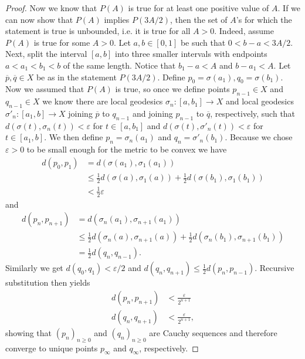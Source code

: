 \documentclass[10pt,a4paper]{amsart}
\begin{document}
\begin{proof}
\medskip
Now we know that $P(A)$ is true for at least one positive value of \(A\). If we can now show that \(P(A)\) implies \(P(3A/2)\), then the set of \(A\)'s for which the statement is true is unbounded, i.e. it is true for all \(A>0\). Indeed, assume $P(A)$ is true for some \(A>0\).
Let \(a,b\in [0,1]\) be such that \(0<b-a<3A/2\).
Next, split the interval \([a,b]\) into three smaller intervals with endpoints \(a<a_1<b_1<b\) of the same length.
Notice that \(b_1-a<A\) and \(b-a_1<A\).
Let \(\overline{p},\overline{q}\in X\) be as in the statement \(P(3A/2)\).
Define \(p_0=\sigma(a_1),q_0=\sigma(b_1)\).
Now we assumed that \(P(A)\) is true, so once we define points \(p_{n-1}\in X\) and \(q_{n-1}\in X\) we know there are local geodesics \(\sigma_n:[a,b_1]\to X\) and local geodesics \(\sigma'_n:[a_1,b]\to X\) joining \(\overline{p}\) to \(q_{n-1}\) and joining \(p_{n-1}\) to \(\overline{q}\), respectively, such that \(d(\sigma(t),\sigma_n(t))<\varepsilon\) for \(t\in [a,b_1]\) and \(d(\sigma(t),\sigma'_n(t))<\varepsilon\) for \(t\in [a_1,b]\).
We then define \(p_n=\sigma_n(a_1)\) and \(q_n=\sigma'_n(b_1)\).
Because we chose \(\varepsilon>0\) to be small enough for the metric to be convex we have 
\begin{align*}
d(p_0,p_1)&=d(\sigma(a_1),\sigma_1(a_1))\\
&\leq \frac{1}{2}d(\sigma(a),\sigma_1(a))+\frac{1}{2}d(\sigma(b_1),\sigma_1(b_1))\\
&<\frac{1}{2}\varepsilon
\end{align*}
and
\begin{align*}
d(p_n,p_{n+1})&=d(\sigma_n(a_1),\sigma_{n+1}(a_1))\\
&\leq\frac{1}{2}d(\sigma_n(a),\sigma_{n+1}(a))+\frac{1}{2}d(\sigma_n(b_1),\sigma_{n+1}(b_1))\\
&=\frac{1}{2}d(q_n,q_{n-1}).
\end{align*}
Similarly we get \(d(q_0,q_1)<\varepsilon/2\) and \(d(q_n,q_{n+1})\leq \frac{1}{2}d(p_n,p_{n-1})\).
Recursive substitution then yields
\begin{align*}
d(p_n,p_{n+1})&<\frac{\varepsilon}{2^{n+1}}\\
d(q_n,q_{n+1})&<\frac{\varepsilon}{2^{n+1}},
\end{align*}
showing that \((p_n)_{n\geq 0}\) and \((q_n)_{n\geq 0}\) are Cauchy sequences and therefore converge to unique points \(p_\infty\) and \(q_\infty\), respectively.


\end{proof}
\end{document}
